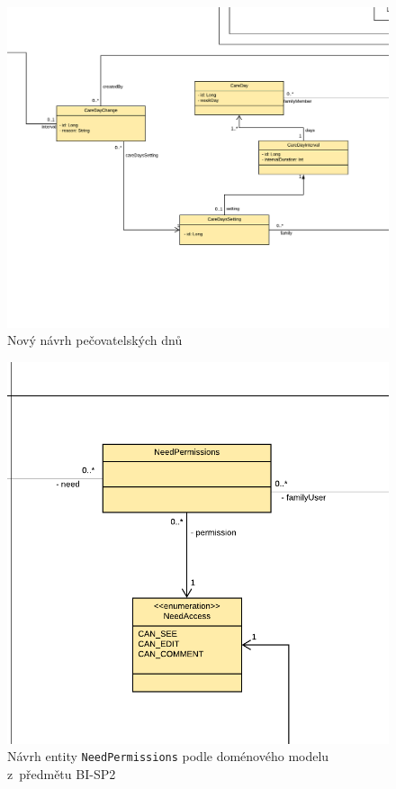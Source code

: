     \begin{figure}\centering
	       \includegraphics[angle=90, height=0.9\textheight]{pdfs/CareDays2}
	       \caption[Nový návrh pečovatelských dnů]{Nový návrh pečovatelských dnů}\label{image:caredays2}
        \end{figure}
          \begin{figure}\centering
	        \includegraphics[width=1.0\textwidth]{pdfs/NeedPermissions1}
	        \caption[Návrh entity \texttt{NeedPermissions}]{Návrh entity \texttt{NeedPermissions} podle doménového modelu z~předmětu BI-SP2}\label{image:NeedPermissions1}
        \end{figure}
